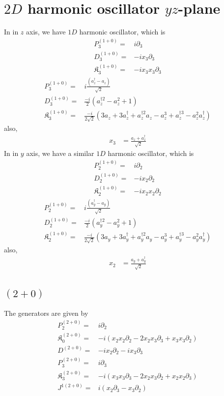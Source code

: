 \documentclass[]{article}
\numberwithin{equation}{section}
\begin{document}
{{\pagebreak
\section{$2D$ harmonic oscillator $yz$-plane} 
In in $z$ axis, we have $1D$ harmonic oscillator, which is
\begin{align}
    P^{(1+0)}_{3}=&i\partial_{3}\\
    D^{(1+0)}_{3}=&-ix_{3}\partial_{3}\\
    \mathfrak{K}^{(1+0)}_{{3}}=&-ix_{3}x_{3}\partial_{{3}}
\end{align}
\begin{align}
    P^{(1+0)}_{3}=&i\frac{(a_{z}^{\dagger}-a_{z})}{\sqrt{2}}\\
    D^{(1+0)}_{3}=&\frac{-i}{2}\left(a_{z}^{\dagger 2} - a_{z}^2+1\right)\\
    \mathfrak{K}^{(1+0)}_{{3}}=&\frac{-i}{2\sqrt{2}}\left(3a_{z}+3a_{z}^{\dagger}+  a_{z}^{\dagger 2}a_{z} - a_{z}^3 +  a_{z}^{\dagger 3} - a_{z}^2 a_{z}^{\dagger}\right)
\end{align}
also, 
\begin{align}
    x_3&=\frac{a_{z}+a_{z}^{\dagger}}{\sqrt{2}}
\end{align}
In in $y$ axis, we have a similar $1D$ harmonic oscillator, which is
\begin{align}
    P^{(1+0)}_{2}=&i\partial_{2}\\
    D^{(1+0)}_{2}=&-ix_{2}\partial_{2}\\
    \mathfrak{K}^{(1+0)}_{{2}}=&-ix_{2}x_{2}\partial_{{2}}
\end{align}
\begin{align}
    P^{(1+0)}_{2}=&i\frac{(a_{y}^{\dagger}-a_{y})}{\sqrt{2}}\\
    D^{(1+0)}_{2}=&\frac{-i}{2}\left(a_{y}^{\dagger 2} - a_{y}^2+1\right)\\
    \mathfrak{K}^{(1+0)}_{{2}}=&\frac{-i}{2\sqrt{2}}\left(3a_{y}+3a_{y}^{\dagger}+  a_{y}^{\dagger 2}a_{y} - a_{y}^3 +  a_{y}^{\dagger 3} - a_{y}^2 a_{y}^{\dagger}\right)
\end{align}
also, 
\begin{align}
    x_2&=\frac{a_{y}+a_{y}^{\dagger}}{\sqrt{2}}
\end{align}

\subsection{$(2+0)$}
The generators are given by
\begin{align}
    P^{(2+0)}_{2}=&i\partial_{2}\\
    \mathfrak{K}^{(2+0)}_{{0}}=&-i(x_{2}x_{2}\partial_{{2}}-2x_{2}x_{3}\partial_{3}+x_{3}x_{3}\partial_{2})\\
    D^{(2+0)}=&-ix_{2}\partial_{2}-ix_{3}\partial_{3}\\
    P^{(2+0)}_{3}=&i\partial_{3}\\
    \mathfrak{K}^{(2+0)}_{{3}}=&-i(x_{3}x_{3}\partial_{{3}}-2x_{2}x_{3}\partial_{2}+x_{2}x_{2}\partial_{3})\\
    J^{1(2+0)}=&i(x_{2}\partial_{3}-x_{3}\partial_{2})
\end{align}

}}
\end{document}
